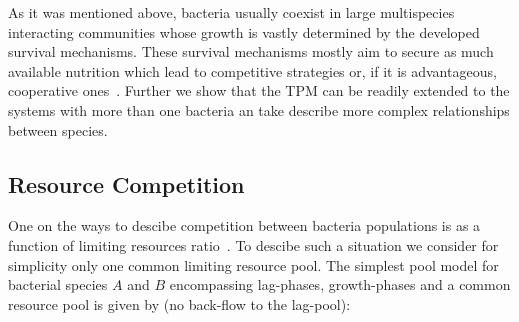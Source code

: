 \documentclass[10pt,A4paper]{article}
\begin{document}
As it was mentioned above, bacteria usually coexist in large multispecies interacting communities whose growth is vastly determined by the developed survival mechanisms.
These survival mechanisms mostly aim to secure as much available nutrition which lead to competitive strategies or, if it is advantageous, cooperative ones~\cite{hibbing_bacterial_2010, stubbendieck_bacterial_2016}.
Further we show that the TPM can be readily extended to the systems with more than one bacteria an take describe more complex relationships between species. 


\subsection{Resource Competition}

One on the ways to descibe competition between bacteria populations is as a function of limiting resources ratio~\cite{tilman_resource_1977, smith_effects_2002}.
To descibe such a situation we consider for simplicity only one common limiting resource pool. 
The simplest pool model for bacterial species $A$ and $B$ encompassing lag-phases, growth-phases and a common resource pool is given by (no back-flow to the lag-pool):
\end{document}
